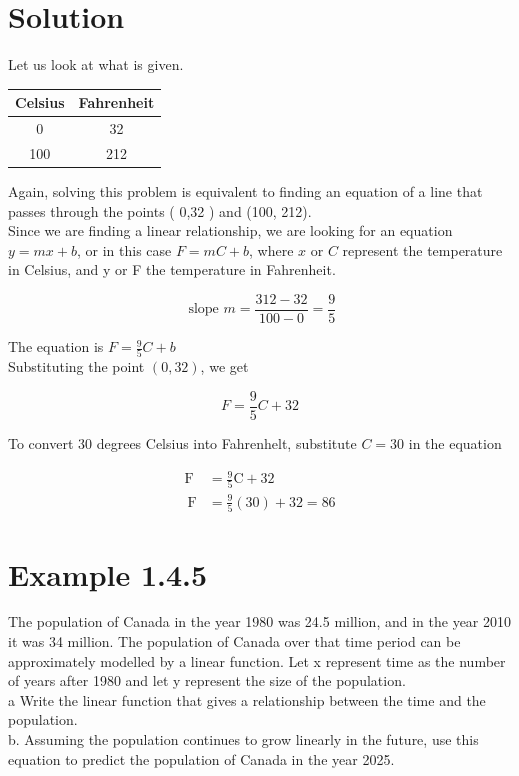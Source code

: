 \section*{Solution}
Let us look at what is given.

\begin{center}
\begin{tabular}{|c|c|}
\hline
Celsius & Fahrenheit \\
\hline
0 & 32 \\
\hline
100 & 212 \\
\hline
\end{tabular}
\end{center}

Again, solving this problem is equivalent to finding an equation of a line that passes through the points ( 0,32 ) and (100, 212).\\
Since we are finding a linear relationship, we are looking for an equation $y=m x+b$, or in this case $F=m C+b$, where $x$ or $C$ represent the temperature in Celsius, and y or F the temperature in Fahrenheit.

$$
\text { slope } m=\frac{312-32}{100-0}=\frac{9}{5}
$$

The equation is $F=\frac{9}{5} C+b$\\
Substituting the point $(0,32)$, we get

$$
F=\frac{9}{5} C+32
$$

To convert 30 degrees Celsius into Fahrenhelt, substitute $C=30$ in the equation

$$
\begin{aligned}
\mathrm{F} & =\frac{9}{5} \mathrm{C}+32 \\
\mathrm{~F} & =\frac{9}{5}(30)+32=86
\end{aligned}
$$

\section*{Example 1.4.5}
The population of Canada in the year 1980 was 24.5 million, and in the year 2010 it was 34 million. The population of Canada over that time period can be approximately modelled by a linear function. Let x represent time as the number of years after 1980 and let y represent the size of the population.\\
a Write the linear function that gives a relationship between the time and the population.\\
b. Assuming the population continues to grow linearly in the future, use this equation to predict the population of Canada in the year 2025.

